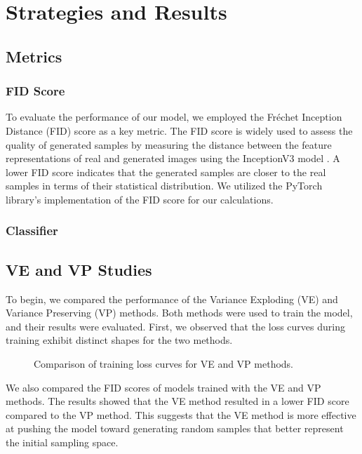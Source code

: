 \chapter{Strategies and Results}

\section{Metrics}
\subsection{FID Score}
To evaluate the performance of our model, we employed the Fréchet Inception Distance (FID) score as a key metric. The FID score is widely used to assess the quality of generated samples by measuring the distance between the feature representations of real and generated images using the InceptionV3 model \cite{inceptionv3}. A lower FID score indicates that the generated samples are closer to the real samples in terms of their statistical distribution. We utilized the PyTorch library's implementation of the FID score \cite{pytorch} for our calculations.

\subsection{Classifier}

\section{VE and VP Studies}
To begin, we compared the performance of the Variance Exploding (VE) and Variance Preserving (VP) methods. Both methods were used to train the model, and their results were evaluated. First, we observed that the loss curves during training exhibit distinct shapes for the two methods.

\begin{figure}[h!]
    \centering
    \caption{Comparison of training loss curves for VE and VP methods.}
\end{figure}

We also compared the FID scores of models trained with the VE and VP methods. The results showed that the VE method resulted in a lower FID score compared to the VP method. This suggests that the VE method is more effective at pushing the model toward generating random samples that better represent the initial sampling space.

